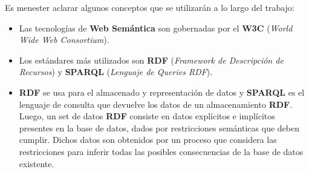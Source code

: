 \documentclass[10pt,a4paper]{article}
\begin{document}
Es menester aclarar algunos conceptos que se utilizarán a lo largo del trabajo:
\begin{itemize}
\item Las tecnologías de \textbf{Web Semántica} son gobernadas por el \textbf{W3C} (\textit{World Wide Web Consortium}).
\item Los estándares más utilizados son \textbf{RDF} (\textit{Framework de Descripción de Recursos}) y \textbf{SPARQL} (\textit{Lenguaje de Queries RDF}).
\item \textbf{RDF} se usa para el almacenado y representación de datos y \textbf{SPARQL} es el lenguaje de consulta que devuelve los datos de un almacenamiento \textbf{RDF}.\\
Luego, un set de datos \textbf{RDF} consiste en datos explícitos e implícitos presentes en la base de datos, dados por restricciones semánticas que deben cumplir. Dichos datos son obtenidos por un proceso que considera las restricciones para inferir todas las posibles consecuencias de la base de datos existente.
\end{itemize}
\end{document}
